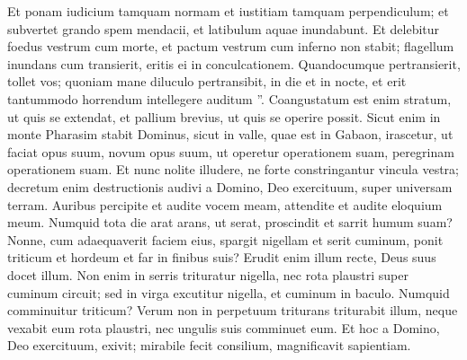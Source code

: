 \begin{biblechapter}
\begin{biblechapter}
\begin{biblechapter}
\begin{biblechapter}
\begin{biblechapter}
\begin{biblechapter}
\begin{biblechapter}
\begin{biblechapter}
\begin{biblechapter}
\begin{biblechapter}
\begin{biblechapter}
\begin{biblechapter}
\begin{biblechapter}
\begin{biblechapter}
\begin{biblechapter}
\begin{biblechapter}
\begin{biblechapter}
\begin{biblechapter}
\begin{biblechapter}
\begin{biblechapter}
\begin{biblechapter}
\begin{biblechapter}
\begin{biblechapter}
\begin{biblechapter}
\begin{biblechapter}
\begin{biblechapter}
\begin{biblechapter}
\begin{biblechapter}
 \verse Et ponam iudicium tamquam normam
 et iustitiam tamquam perpendiculum;
 et subvertet grando spem mendacii,
 et latibulum aquae inundabunt.
 \verse Et delebitur foedus vestrum cum morte,
 et pactum vestrum cum inferno non stabit;
 flagellum inundans cum transierit,
 eritis ei in conculcationem.
 \verse Quandocumque pertransierit, tollet vos;
 quoniam mane diluculo pertransibit,
 in die et in nocte,
 et erit tantummodo horrendum intellegere auditum ”.
 \verse Coangustatum est enim stratum, ut quis se extendat,
 et pallium brevius, ut quis se operire possit.
 \verse Sicut enim in monte Pharasim stabit Dominus,
 sicut in valle, quae est in Gabaon, irascetur,
 ut faciat opus suum, novum opus suum,
 ut operetur operationem suam,
 peregrinam operationem suam.
 \verse Et nunc nolite illudere,
 ne forte constringantur vincula vestra;
 decretum enim destructionis audivi
 a Domino, Deo exercituum,
 super universam terram.
 \verse Auribus percipite et audite vocem meam,
 attendite et audite eloquium meum.
 \verse Numquid tota die arat arans, ut serat,
 proscindit et sarrit humum suam?
 \verse Nonne, cum adaequaverit faciem eius,
 spargit nigellam et serit cuminum,
 ponit triticum et hordeum
 et far in finibus suis?
 \verse Erudit enim illum recte,
 Deus suus docet illum.
 \verse Non enim in serris trituratur nigella,
 nec rota plaustri super cuminum circuit;
 sed in virga excutitur nigella,
 et cuminum in baculo.
 \verse Numquid comminuitur triticum?
 Verum non in perpetuum triturans triturabit illum,
 neque vexabit eum rota plaustri,
 nec ungulis suis comminuet eum.
 \verse Et hoc a Domino, Deo exercituum, exivit;
 mirabile fecit consilium,
 magnificavit sapientiam.
 

\end{biblechapter}
\end{biblechapter}
\end{biblechapter}
\end{biblechapter}
\end{biblechapter}
\end{biblechapter}
\end{biblechapter}
\end{biblechapter}
\end{biblechapter}
\end{biblechapter}
\end{biblechapter}
\end{biblechapter}
\end{biblechapter}
\end{biblechapter}
\end{biblechapter}
\end{biblechapter}
\end{biblechapter}
\end{biblechapter}
\end{biblechapter}
\end{biblechapter}
\end{biblechapter}
\end{biblechapter}
\end{biblechapter}
\end{biblechapter}
\end{biblechapter}
\end{biblechapter}
\end{biblechapter}
\end{biblechapter}

